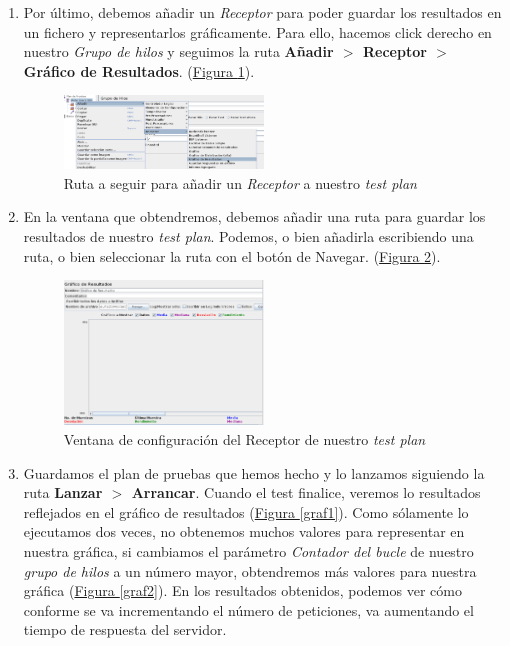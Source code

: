\documentclass[10pt,a4paper,spanish]{article}
\numberwithin{equation}{section} %
\numberwithin{figure}{section} %
\numberwithin{table}{section} %
\begin{document}
\begin{enumerate}[1.]
    \item Por último, debemos añadir un \textit{Receptor} para poder guardar los resultados en un fichero y representarlos gráficamente. Para ello, hacemos click derecho en nuestro \textit{Grupo de hilos} y seguimos la ruta \textbf{Añadir $>$ Receptor $>$ Gráfico de Resultados}. (\hyperref[rutareceptor]{Figura \ref*{rutareceptor}}).

    \begin{figure}[!h]
        \centering
        \includegraphics[width=0.5\textwidth]{18}
        \caption{Ruta a seguir para añadir un \textit{Receptor} a nuestro \textit{test plan}}
        \label{rutareceptor}
    \end{figure}

    \item En la ventana que obtendremos, debemos añadir una ruta para guardar los resultados de nuestro \textit{test plan}. Podemos, o bien añadirla escribiendo una ruta, o bien seleccionar la ruta con el botón de Navegar. (\hyperref[ventanareceptor]{Figura \ref*{ventanareceptor}}).

    \begin{figure}[!h]
        \centering
        \includegraphics[width=0.5\textwidth]{19}
        \caption{Ventana de configuración del Receptor de nuestro \textit{test plan}}
        \label{ventanareceptor}
    \end{figure}

    \item Guardamos el plan de pruebas que hemos hecho y lo lanzamos siguiendo la ruta \textbf{Lanzar $>$ Arrancar}. Cuando el test finalice, veremos lo resultados reflejados en el gráfico de resultados (\hyperref[graf1]{Figura \ref*{graf1}}). Como sólamente lo ejecutamos dos veces, no obtenemos muchos valores para representar en nuestra gráfica, si cambiamos el parámetro \textit{Contador del bucle} de nuestro \textit{grupo de hilos} a un número mayor, obtendremos más valores para nuestra gráfica (\hyperref[graf2]{Figura \ref*{graf2}}). En los resultados obtenidos, podemos ver cómo conforme se va incrementando el número de peticiones, va aumentando el tiempo de respuesta del servidor.


\end{enumerate}
\end{document}

